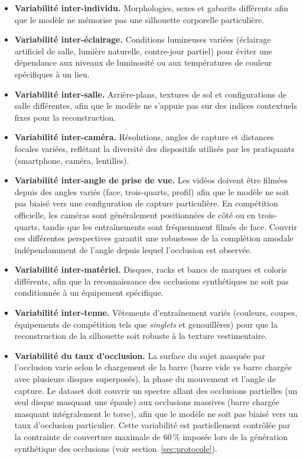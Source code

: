 \begin{itemize}
  \item \textbf{Variabilité inter-individu.} Morphologies, sexes et gabarits différents afin que le modèle ne mémorise pas une silhouette corporelle particulière.
  \item \textbf{Variabilité inter-éclairage.} Conditions lumineuses variées (éclairage artificiel de salle, lumière naturelle, contre-jour partiel) pour éviter une dépendance aux niveaux de luminosité ou aux températures de couleur spécifiques à un lieu.
  \item \textbf{Variabilité inter-salle.} Arrière-plans, textures de sol et configurations de salle différentes, afin que le modèle ne s'appuie pas sur des indices contextuels fixes pour la reconstruction.
  \item \textbf{Variabilité inter-caméra.} Résolutions, angles de capture et distances focales variées, reflétant la diversité des dispositifs utilisés par les pratiquants (smartphone, caméra, lentilles).
  \item \textbf{Variabilité inter-angle de prise de vue.} Les vidéos doivent être filmées depuis des angles variés (face, trois-quarts, profil) afin que le modèle ne soit pas biaisé vers une configuration de capture particulière. En compétition officielle, les caméras sont généralement positionnées de côté ou en trois-quarts, tandis que les entraînements sont fréquemment filmés de face. Couvrir ces différentes perspectives garantit une robustesse de la complétion amodale indépendamment de l'angle depuis lequel l'occlusion est observée.
  \item \textbf{Variabilité inter-matériel.} Disques, racks et bancs de marques et coloris différents, afin que la reconnaissance des occlusions synthétiques ne soit pas conditionnée à un équipement spécifique.
  \item \textbf{Variabilité inter-tenue.} Vêtements d'entraînement variés (couleurs, coupes, équipements de compétition tels que \textit{singlets} et genouillères) pour que la reconstruction de la silhouette soit robuste à la texture vestimentaire.
  \item \textbf{Variabilité du taux d'occlusion.} La surface du sujet masquée par l'occlusion varie selon le chargement de la barre (barre vide vs barre chargée avec plusieurs disques superposés), la phase du mouvement et l'angle de capture. Le dataset doit couvrir un spectre allant des occlusions partielles (un seul disque masquant une épaule) aux occlusions massives (barre chargée masquant intégralement le torse), afin que le modèle ne soit pas biaisé vers un taux d'occlusion particulier. Cette variabilité est partiellement contrôlée par la contrainte de couverture maximale de 60\,\% imposée lors de la génération synthétique des occlusions (voir section~\ref{sec:protocole}).
\end{itemize}

